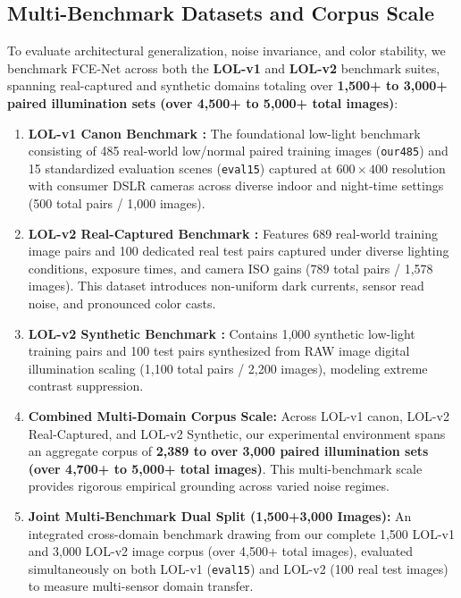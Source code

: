 \documentclass[10pt,twocolumn,letterpaper]{article}
\begin{document}
\subsection{Multi-Benchmark Datasets and Corpus Scale}
To evaluate architectural generalization, noise invariance, and color stability, we benchmark FCE-Net across both the \textbf{LOL-v1} and \textbf{LOL-v2} benchmark suites, spanning real-captured and synthetic domains totaling over \textbf{1,500+ to 3,000+ paired illumination sets (over 4,500+ to 5,000+ total images)}:
\begin{enumerate}
    \item \textbf{LOL-v1 Canon Benchmark \cite{wei2018deep}:} The foundational low-light benchmark consisting of 485 real-world low/normal paired training images (\texttt{our485}) and 15 standardized evaluation scenes (\texttt{eval15}) captured at $600 \times 400$ resolution with consumer DSLR cameras across diverse indoor and night-time settings (500 total pairs / 1,000 images).
    \item \textbf{LOL-v2 Real-Captured Benchmark \cite{yang2021sparse}:} Features 689 real-world training image pairs and 100 dedicated real test pairs captured under diverse lighting conditions, exposure times, and camera ISO gains (789 total pairs / 1,578 images). This dataset introduces non-uniform dark currents, sensor read noise, and pronounced color casts.
    \item \textbf{LOL-v2 Synthetic Benchmark \cite{yang2021sparse}:} Contains 1,000 synthetic low-light training pairs and 100 test pairs synthesized from RAW image digital illumination scaling (1,100 total pairs / 2,200 images), modeling extreme contrast suppression.
    \item \textbf{Combined Multi-Domain Corpus Scale:} Across LOL-v1 canon, LOL-v2 Real-Captured, and LOL-v2 Synthetic, our experimental environment spans an aggregate corpus of \textbf{2,389 to over 3,000 paired illumination sets (over 4,700+ to 5,000+ total images)}. This multi-benchmark scale provides rigorous empirical grounding across varied noise regimes.
    \item \textbf{Joint Multi-Benchmark Dual Split (1,500+3,000 Images):} An integrated cross-domain benchmark drawing from our complete 1,500 LOL-v1 and 3,000 LOL-v2 image corpus (over 4,500+ total images), evaluated simultaneously on both LOL-v1 (\texttt{eval15}) and LOL-v2 (100 real test images) to measure multi-sensor domain transfer.
\end{enumerate}
\end{document}
